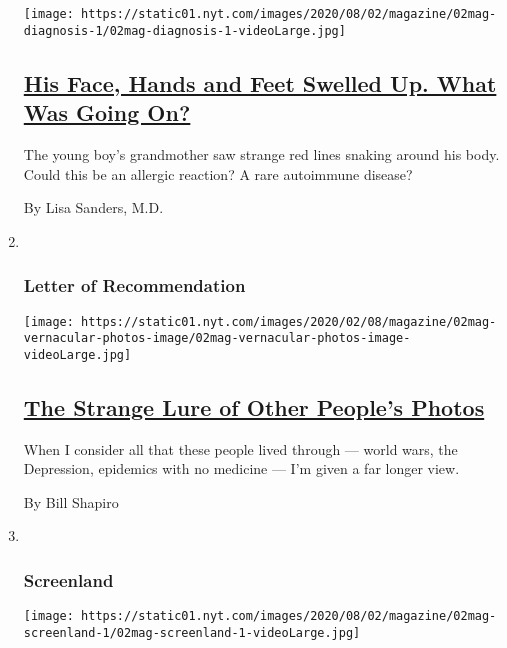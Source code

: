 \begin{enumerate}
  \texttt{[image: https://static01.nyt.com/images/2020/08/02/magazine/02mag-diagnosis-1/02mag-diagnosis-1-videoLarge.jpg]}

  \hypertarget{his-face-hands-and-feet-swelled-up-what-was-going-on}{%
  \subsection{\texorpdfstring{\href{/2020/07/30/magazine/urticaria-multiforme.html}{His
  Face, Hands and Feet Swelled Up. What Was Going
  On?}}{His Face, Hands and Feet Swelled Up. What Was Going On?}}\label{his-face-hands-and-feet-swelled-up-what-was-going-on}}

  The young boy's grandmother saw strange red lines snaking around his
  body. Could this be an allergic reaction? A rare autoimmune disease?

  By Lisa Sanders, M.D.
\item ~
  \hypertarget{letter-of-recommendation}{%
  \subsubsection{Letter of
  Recommendation}\label{letter-of-recommendation}}

  \texttt{[image: https://static01.nyt.com/images/2020/02/08/magazine/02mag-vernacular-photos-image/02mag-vernacular-photos-image-videoLarge.jpg]}

  \hypertarget{the-strange-lure-of-other-peoples-photos}{%
  \subsection{\texorpdfstring{\href{/2020/07/30/magazine/the-strange-lure-of-other-peoples-photos.html}{The
  Strange Lure of Other People's
  Photos}}{The Strange Lure of Other People's Photos}}\label{the-strange-lure-of-other-peoples-photos}}

  When I consider all that these people lived through --- world wars,
  the Depression, epidemics with no medicine --- I'm given a far longer
  view.

  By Bill Shapiro
\item ~
  \hypertarget{screenland}{%
  \subsubsection{Screenland}\label{screenland}}

  \texttt{[image: https://static01.nyt.com/images/2020/08/02/magazine/02mag-screenland-1/02mag-screenland-1-videoLarge.jpg]}


\end{enumerate}
